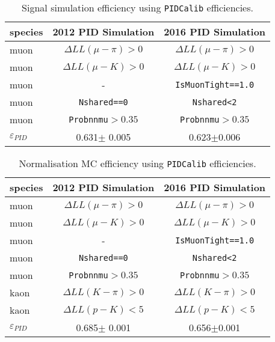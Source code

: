 \begin{table}[H]
\begin{center}
\begin{tabular}{l c c}

    species  & 2012 PID Simulation & 2016 PID Simulation\\ \hline
    muon &  $\Delta LL(\mu - \pi) > 0$ & $\Delta LL(\mu - \pi) > 0$ \\
    muon &  $\Delta LL(\mu - K) > 0$ & $\Delta LL(\mu - K) > 0$ \\
    muon &   - & \texttt{IsMuonTight==1.0}\\
    muon &  \texttt{Nshared==0} & \texttt{Nshared<2} \\
	muon &  \texttt{Probnnmu}$>0.35$ & \texttt{Probnnmu}$>0.35$ \\
     \hline
   $\varepsilon_{PID}$   & 0.631$\pm$ 0.005 & 0.623$\pm$0.006 \\

     \hline
      \end{tabular}

\end{center}
\caption{Signal simulation efficiency using \texttt{PIDCalib} efficiencies.}
\label{tab:PIDselection}
\end{table}

\begin{table}[H]
\begin{center}
\begin{tabular}{l c c}

    species  &2012 PID Simulation & 2016 PID Simulation\\ \hline
    muon &  $\Delta LL(\mu - \pi) > 0$ & $\Delta LL(\mu - \pi) > 0$ \\
    muon & $\Delta LL(\mu - K) > 0$ & $\Delta LL(\mu - K) > 0$ \\
    muon &  - & \texttt{IsMuonTight==1.0}\\
    muon & \texttt{Nshared==0} & \texttt{Nshared<2} \\
    muon & \texttt{Probnnmu}$>0.35$ & \texttt{Probnnmu}$>0.35$ \\
    kaon &  $\Delta LL(K - \pi) > 0$ & $\Delta LL(K - \pi) > 0$ \\
    kaon &  $\Delta LL(p - K) < 5$ & $\Delta LL(p - K) < 5$ \\
     \hline
    $\varepsilon_{PID}$ &0.685$\pm$ 0.001 & 0.656$\pm$0.001  \\

     \hline
      \end{tabular}

\end{center}
\caption{Normalisation MC efficiency using \texttt{PIDCalib} efficiencies.}
\label{tab:PIDselectionNorm}
\end{table}


